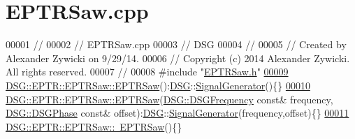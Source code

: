 \hypertarget{_e_p_t_r_saw_8cpp_source}{\section{E\+P\+T\+R\+Saw.\+cpp}
\label{_e_p_t_r_saw_8cpp_source}
}

\begin{DoxyCode}
00001 \textcolor{comment}{//}
00002 \textcolor{comment}{//  EPTRSaw.cpp}
00003 \textcolor{comment}{//  DSG}
00004 \textcolor{comment}{//}
00005 \textcolor{comment}{//  Created by Alexander Zywicki on 9/29/14.}
00006 \textcolor{comment}{//  Copyright (c) 2014 Alexander Zywicki. All rights reserved.}
00007 \textcolor{comment}{//}
00008 \textcolor{preprocessor}{#include "\hyperlink{_e_p_t_r_saw_8h}{EPTRSaw.h}"}
\hypertarget{_e_p_t_r_saw_8cpp_source_l00009}{}\hyperlink{class_d_s_g_1_1_e_p_t_r_1_1_e_p_t_r_saw_a65c2009548fb7f946d48ea794c830501}{00009} \hyperlink{class_d_s_g_1_1_e_p_t_r_1_1_e_p_t_r_saw_a65c2009548fb7f946d48ea794c830501}{DSG::EPTR::EPTRSaw::EPTRSaw}():\hyperlink{namespace_d_s_g}{DSG}::\hyperlink{class_d_s_g_1_1_signal_generator}{SignalGenerator}()\{\}
\hypertarget{_e_p_t_r_saw_8cpp_source_l00010}{}\hyperlink{class_d_s_g_1_1_e_p_t_r_1_1_e_p_t_r_saw_a3a571a16f3ef0e230db2daa0cd249855}{00010} \hyperlink{class_d_s_g_1_1_e_p_t_r_1_1_e_p_t_r_saw_a65c2009548fb7f946d48ea794c830501}{DSG::EPTR::EPTRSaw::EPTRSaw}(\hyperlink{namespace_d_s_g_a4315a061386fa1014fda09b15d3a6973}{DSG::DSGFrequency} \textcolor{keyword}{const}& frequency,
      \hyperlink{namespace_d_s_g_a44431ce1eb0a7300efdd207bc879e52c}{DSG::DSGPhase} \textcolor{keyword}{const}& offset):\hyperlink{namespace_d_s_g}{DSG}::\hyperlink{class_d_s_g_1_1_signal_generator}{SignalGenerator}(frequency,offset)\{\}
\hypertarget{_e_p_t_r_saw_8cpp_source_l00011}{}\hyperlink{class_d_s_g_1_1_e_p_t_r_1_1_e_p_t_r_saw_a932fb8ef2df61ed06e6cca5cdc622884}{00011} \hyperlink{class_d_s_g_1_1_e_p_t_r_1_1_e_p_t_r_saw_a932fb8ef2df61ed06e6cca5cdc622884}{DSG::EPTR::EPTRSaw::~EPTRSaw}()\{\}
\end{DoxyCode}
